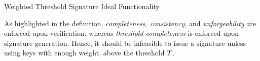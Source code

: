 {}{\label{fig:Fweight} Weighted Threshold Signature Ideal Functionality}

As highlighted in the definition, \emph{completeness, consistency}, and
\emph{unforgeability} are enforced upon verification, whereas \emph{threshold
completeness} is enforced upon signature generation. Hence, it should be
infeasible to issue a signature unless using keys with enough weight, \ie above
the threshold $T$.
